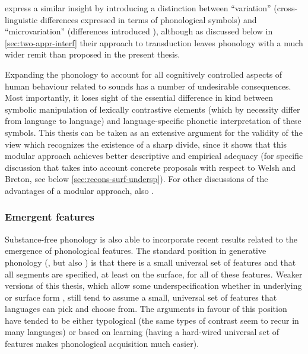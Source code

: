 \citet{hale-kissock-reiss,hale-reiss2008} express a similar insight by introducing a distinction between \enquote{variation} (cross\hyp linguistic differences expressed in terms of phonological symbols) and \enquote{microvariation} (differences introduced ), although as discussed below in \cref{sec:two-appr-interf} their approach to transduction leaves phonology with a much wider remit than proposed in the present thesis.

Expanding the phonology to account for all cognitively controlled aspects of human behaviour related to sounds has a number of undesirable consequences. Most importantly, it loses sight of the essential difference in kind between symbolic manipulation of lexically contrastive elements (which by necessity differ from language to language) and language\hyp specific phonetic interpretation of these symbols. This thesis can be taken as an extensive argument for the validity of the view which recognizes the existence of a sharp divide, since it shows that this modular approach achieves better descriptive and empirical adequacy (for specific discussion that takes into account concrete proposals with respect to Welsh and Breton, see below \cref{sec:recons-surf-undersp}). For other discussions of the advantages of a modular approach, \cf also \citet{van_oostendorp_coe,bermudez-diachr,bermudez-oterong}.

\subsubsection{Emergent features}
\label{sec:emergent-features}

Substance\hyp free phonology is also able to incorporate recent results related to the emergence of phonological features. The standard position in generative phonology (\citealp{spe}, but also \citealp{jfh}) is that there is a small universal set of features and that all segments are specified, at least on the surface, for all of these features. Weaker versions of this thesis, which allow some underspecification whether in underlying or surface form \citep[\egm][]{kiparsky85:_some_lexic_phonol,kiparsky95,steriade87:_redun,steriade-hbk,archangeli1988,archangeli-pulleyblank,hale-kissock-reiss,hale-reiss2008}, still tend to assume a small, universal set of features that languages can pick and choose from. The arguments in favour of this position have tended to be either typological (the same types of contrast seem to recur in many languages) or based on learning (having a hard\hyp wired universal set of features makes phonological acquisition much easier).

